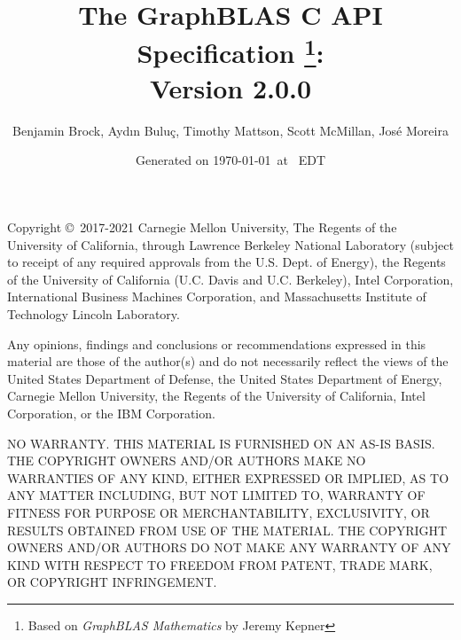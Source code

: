 \documentclass[11pt]{extbook}
\begin{document}

\title{
The GraphBLAS C API Specification
\footnote{Based on \emph{GraphBLAS Mathematics} by Jeremy Kepner}: \\ 
{\large Version 2.0.0} \\
{\normalsize {}}
}

\author{Benjamin Brock, Ayd\i n Bulu\c{c}, Timothy Mattson, Scott McMillan, Jos\'e Moreira}

\date{Generated on \today\ at \currenttime\ EDT}

\maketitle


\renewcommand{\thefootnote}{\arabic{footnote}}
\setcounter{footnote}{0}

\vfill

Copyright \copyright\ 2017-2021 Carnegie Mellon University, The Regents 
of the University of California, through Lawrence Berkeley National 
Laboratory (subject to receipt of any required approvals from the 
U.S. Dept. of Energy), the Regents of the University of California 
(U.C. Davis and U.C. Berkeley), Intel Corporation, International Business Machines 
Corporation, and Massachusetts Institute of Technology Lincoln
Laboratory. 

Any opinions, findings and conclusions or recommendations expressed in 
this material are those of the author(s) and do not necessarily reflect 
the views of the United States Department of Defense, the United States 
Department of Energy, Carnegie Mellon University, the Regents of the 
University of California, Intel Corporation, or the IBM Corporation.  

NO WARRANTY. THIS MATERIAL IS FURNISHED ON AN AS-IS BASIS. THE COPYRIGHT 
OWNERS AND/OR AUTHORS MAKE NO WARRANTIES OF ANY KIND, EITHER EXPRESSED 
OR IMPLIED, AS TO ANY MATTER INCLUDING, BUT NOT LIMITED TO, WARRANTY OF 
FITNESS FOR PURPOSE OR MERCHANTABILITY, EXCLUSIVITY, OR RESULTS OBTAINED 
FROM USE OF THE MATERIAL. THE COPYRIGHT OWNERS AND/OR AUTHORS DO NOT MAKE 
ANY WARRANTY OF ANY KIND WITH RESPECT TO FREEDOM FROM PATENT, TRADE MARK, 
OR COPYRIGHT INFRINGEMENT.

\vspace{1.5cm}

\vspace{2cm}
\end{document}
